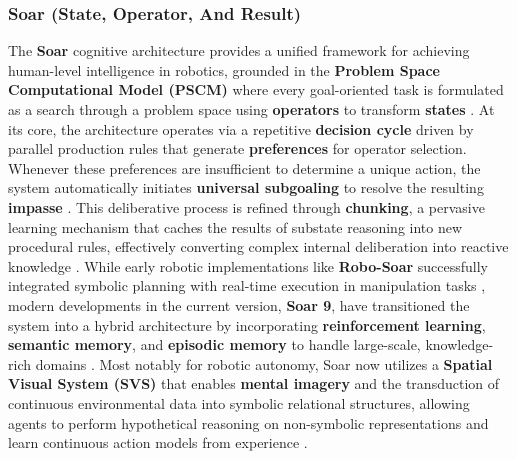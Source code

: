 \documentclass[a4paper]{article}
\begin{document}
\subsubsection{Soar (State, Operator, And Result)}
The \textbf{Soar} cognitive architecture provides a unified framework for achieving human-level intelligence in robotics, grounded in the \textbf{Problem Space Computational Model (PSCM)} where every goal-oriented task is formulated as a search through a problem space using \textbf{operators} to transform \textbf{states} \cite{laird1987soar, laird2019soar}. At its core, the architecture operates via a repetitive \textbf{decision cycle} driven by parallel production rules that generate \textbf{preferences} for operator selection. Whenever these preferences are insufficient to determine a unique action, the system automatically initiates \textbf{universal subgoaling} to resolve the resulting \textbf{impasse} \cite{laird1987soar, laird2019soar}. This deliberative process is refined through \textbf{chunking}, a pervasive learning mechanism that caches the results of substate reasoning into new procedural rules, effectively converting complex internal deliberation into reactive knowledge \cite{laird1987soar, laird1991robo}. While early robotic implementations like \textbf{Robo-Soar} successfully integrated symbolic planning with real-time execution in manipulation tasks \cite{laird1991robo}, modern developments in the current version, \textbf{Soar 9}, have transitioned the system into a hybrid architecture by incorporating \textbf{reinforcement learning}, \textbf{semantic memory}, and \textbf{episodic memory} to handle large-scale, knowledge-rich domains \cite{laird2012cognitive, laird2019soar}. Most notably for robotic autonomy, Soar now utilizes a \textbf{Spatial Visual System (SVS)} that enables \textbf{mental imagery} and the transduction of continuous environmental data into symbolic relational structures, allowing agents to perform hypothetical reasoning on non-symbolic representations and learn continuous action models from experience \cite{laird2012cognitive, laird2019soar}.
\end{document}
